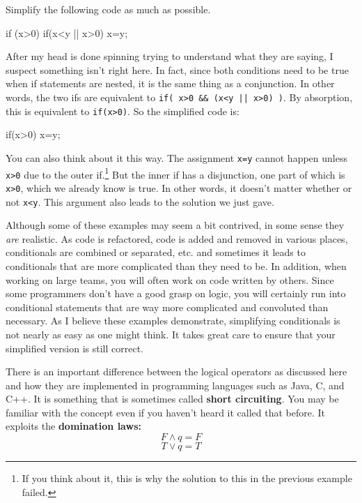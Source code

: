 \begin{exer}
Simplify the following code as much as possible. 
\begin{code} 
    if (x>0) {
        if(x<y || x>0) {
            x=y;
        }
    }
\end{code}
\vspace*{1.5in}
\begin{answer}
After my head is done spinning trying to understand what they are
saying, I suspect something isn't right here. In fact,
since both conditions need to be true when if statements are nested, it is the same thing as a conjunction.
In other words, the two ifs are equivalent to \verb+if( x>0 && (x<y || x>0) )+.
By absorption, this is equivalent to \verb+if(x>0)+.
So the simplified code is:
\begin{code}
    if(x>0) {
        x=y;
    }
\end{code}
You can also think about it this way.  The assignment \verb+x=y+ cannot happen unless \verb+x>0+ due to the outer
if.\footnote{If you think about it, this is why the solution to this in the previous example failed.}
But the inner if has a disjunction, one part of which is \verb+x>0+, which we already know is true.
In other words, it doesn't matter whether or not \verb+x<y+.  This argument also leads to the solution we just gave.
\end{answer}
\end{exer}

Although some of these examples may seem a bit contrived, in some sense they {\em are} realistic.  As code is
refactored, code is added and removed in various places, conditionals are combined or separated, etc. and sometimes
it leads to conditionals that are more complicated than they need to be.  In addition, when working on large teams,
you will often work on code written by others.  Since some programmers don't have a good grasp on logic, you will
certainly run into conditional statements that are way more complicated and convoluted than necessary. 
As I believe these examples demonstrate, simplifying conditionals is not nearly as easy as one might think.
It takes great care to ensure that your simplified version is still correct.

\begin{rem}
There is an important difference between the logical operators as discussed here and 
how they are implemented in programming languages such as Java, C, and C++.
It is something that is sometimes called {\bf short circuiting}.
You may be familiar with the concept even if you haven't heard it called that before.
It exploits the {\bf domination laws:}
$$F \wedge q = F$$
$$T \vee q = T$$
\end{rem}

